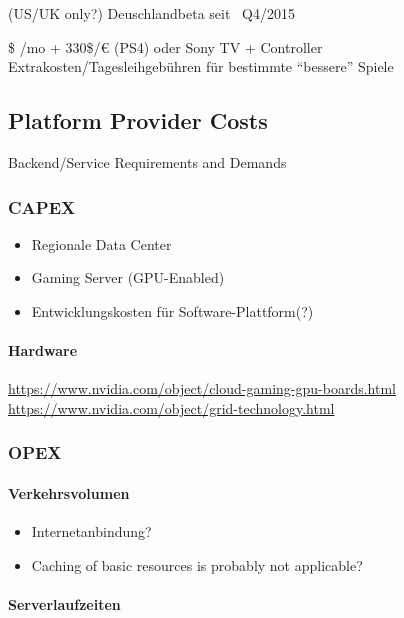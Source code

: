 (US/UK only?) Deuschlandbeta seit ~Q4/2015

\$ /mo + 330\$/€ (PS4) oder Sony TV + Controller
Extrakosten/Tagesleihgebühren für bestimmte ``bessere'' Spiele




\subsection{Platform Provider Costs}
Backend/Service Requirements and Demands

\subsubsection{CAPEX}

\begin{itemize}
	\item Regionale Data Center
	\item Gaming Server (GPU-Enabled)
	\item Entwicklungskosten für Software-Plattform(?)
\end{itemize}

\paragraph{Hardware}

\url{https://www.nvidia.com/object/cloud-gaming-gpu-boards.html}
\url{https://www.nvidia.com/object/grid-technology.html}


\subsubsection{OPEX}

\paragraph{Verkehrsvolumen}

\begin{itemize}
	\item Internetanbindung?
	\item Caching of basic resources is probably not applicable?
\end{itemize}

\paragraph{Serverlaufzeiten}

